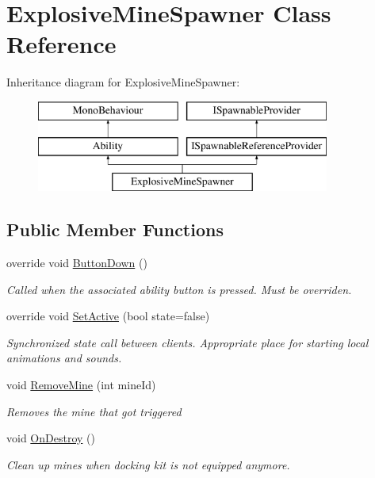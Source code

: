 \hypertarget{class_explosive_mine_spawner}{}\section{Explosive\+Mine\+Spawner Class Reference}
\label{class_explosive_mine_spawner}
Inheritance diagram for Explosive\+Mine\+Spawner\+:\begin{figure}[H]
\begin{center}
\leavevmode
\includegraphics[height=3.000000cm]{class_explosive_mine_spawner}
\end{center}
\end{figure}
\subsection*{Public Member Functions}
\begin{DoxyCompactItemize}
\item 
override void \hyperlink{class_explosive_mine_spawner_a564b8d5b2b851dd2de186d4375c579fb}{Button\+Down} ()
\begin{DoxyCompactList}\small\item\em Called when the associated ability button is pressed. Must be overriden. \end{DoxyCompactList}\item 
override void \hyperlink{class_explosive_mine_spawner_acef27903b71a80e7dffb8262b92b0b69}{Set\+Active} (bool state=false)
\begin{DoxyCompactList}\small\item\em Synchronized state call between clients. Appropriate place for starting local animations and sounds. \end{DoxyCompactList}\item 
void \hyperlink{class_explosive_mine_spawner_a8c988e5aad957749f9d990cf9bb4f169}{Remove\+Mine} (int mine\+Id)
\begin{DoxyCompactList}\small\item\em Removes the mine that got triggered \end{DoxyCompactList}\item 
void \hyperlink{class_explosive_mine_spawner_a241dd83d808eea6450f490907d42bf51}{On\+Destroy} ()
\begin{DoxyCompactList}\small\item\em Clean up mines when docking kit is not equipped anymore. \end{DoxyCompactList}\end{DoxyCompactItemize}
